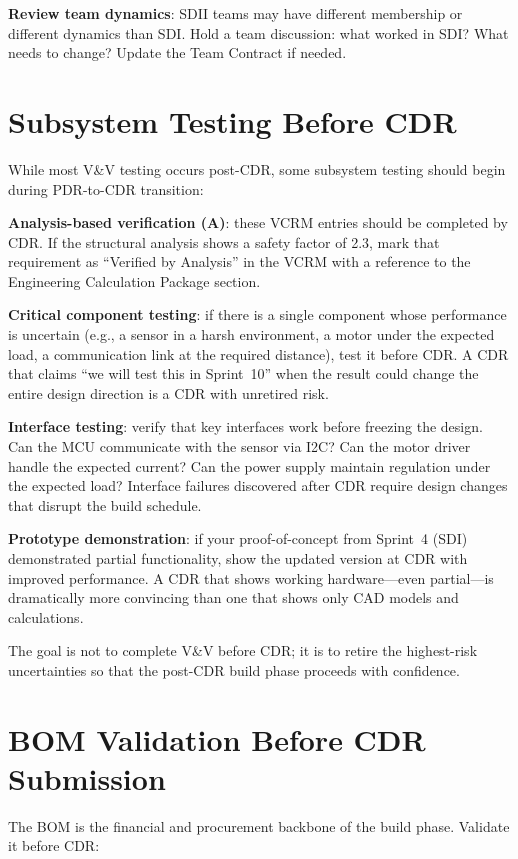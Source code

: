 \textbf{Review team dynamics}: SDII teams may have different membership or different dynamics than SDI. Hold a team discussion: what worked in SDI? What needs to change? Update the Team Contract if needed.



\section{Subsystem Testing Before CDR}
While most V\&V testing occurs post-CDR, some subsystem testing should begin during PDR-to-CDR transition:

\textbf{Analysis-based verification (A)}: these VCRM entries should be completed by CDR. If the structural analysis shows a safety factor of 2.3, mark that requirement as ``Verified by Analysis'' in the VCRM with a reference to the Engineering Calculation Package section.

\textbf{Critical component testing}: if there is a single component whose performance is uncertain (e.g., a sensor in a harsh environment, a motor under the expected load, a communication link at the required distance), test it before CDR. A CDR that claims ``we will test this in Sprint~10'' when the result could change the entire design direction is a CDR with unretired risk.

\textbf{Interface testing}: verify that key interfaces work before freezing the design. Can the MCU communicate with the sensor via I2C? Can the motor driver handle the expected current? Can the power supply maintain regulation under the expected load? Interface failures discovered after CDR require design changes that disrupt the build schedule.

\textbf{Prototype demonstration}: if your proof-of-concept from Sprint~4 (SDI) demonstrated partial functionality, show the updated version at CDR with improved performance. A CDR that shows working hardware---even partial---is dramatically more convincing than one that shows only CAD models and calculations.

The goal is not to complete V\&V before CDR; it is to retire the highest-risk uncertainties so that the post-CDR build phase proceeds with confidence.



\section{BOM Validation Before CDR Submission}
The BOM is the financial and procurement backbone of the build phase. Validate it before CDR:

